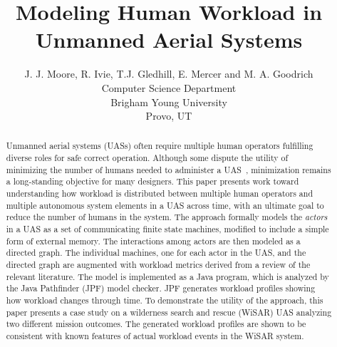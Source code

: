 \documentclass[letterpaper]{article}
\begin{document}
%
\title{Modeling Human Workload in Unmanned Aerial Systems}
\author{J. J. Moore, R. Ivie, T.J. Gledhill, E. Mercer and M. A. Goodrich\\
Computer Science Department \\ Brigham Young University \\ Provo, UT\\
}
\maketitle
\begin{abstract}
Unmanned aerial systems (UASs) often require multiple human operators fulfilling diverse roles for safe correct operation.  Although some dispute the utility of minimizing the number of humans needed to administer a UAS~\cite{MurphyBurke2010}, minimization remains a long-standing objective for many designers.  This paper presents work toward understanding how workload is distributed between multiple human operators and multiple autonomous system elements in a UAS across time, with an ultimate goal to reduce the number of humans in the system. The approach formally models the {\em actors} in a UAS as a set of communicating finite state machines, modified to include a simple form of external memory. The interactions among actors are then modeled as a directed graph.  The individual machines, one for each actor in the UAS, and the directed graph are augmented with workload metrics derived from a review of the relevant literature. The model is implemented as a Java program, which is analyzed by the Java Pathfinder (JPF) model checker. JPF generates workload profiles showing how workload changes through time.  To demonstrate the utility of the approach, this paper presents a case study on a wilderness search and rescue (WiSAR) UAS analyzing two different mission outcomes. The generated workload profiles are shown to be consistent with known features of actual workload events in the WiSAR system. 
\end{abstract}

\noindent 




%



\end{document}
